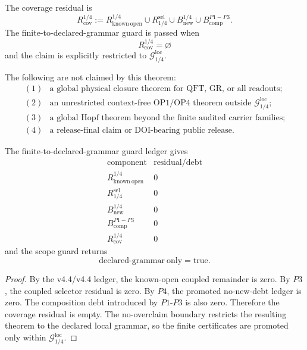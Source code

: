 \begin{definition}
The coverage residual is
\[
    R_{\mathrm{cov}}^{1/4}
    :=
    R_{\mathrm{known\ open}}^{1/4}
    \cup
    R_{1/4}^{\mathrm{sel}}
    \cup
    B_{\mathrm{new}}^{1/4}
    \cup
    B_{\mathrm{comp}}^{P1-P3}.
\]
The finite-to-declared-grammar guard is passed when
\[
    R_{\mathrm{cov}}^{1/4}=\varnothing
\]
and the claim is explicitly restricted to \(\mathcal G_{1/4}^{\mathrm{loc}}\).
\end{definition}

\begin{definition}
The following are not claimed by this theorem:
\[
\begin{array}{ll}
(1) & \text{a global physical closure theorem for QFT, GR, or all readouts;}\\
(2) & \text{an unrestricted context-free OP1/OP4 theorem outside }
      \mathcal G_{1/4}^{\mathrm{loc}};\\
(3) & \text{a global Hopf theorem beyond the finite audited carrier families;}\\
(4) & \text{a release-final claim or DOI-bearing public release.}
\end{array}
\]
\end{definition}

\begin{proposition}
The finite-to-declared-grammar guard ledger gives
\[
\begin{array}{c|r}
\text{component} & \text{residual/debt}\\
\hline
R_{\mathrm{known\ open}}^{1/4} & 0\\
R_{1/4}^{\mathrm{sel}} & 0\\
B_{\mathrm{new}}^{1/4} & 0\\
B_{\mathrm{comp}}^{P1-P3} & 0\\
R_{\mathrm{cov}}^{1/4} & 0
\end{array}
\]
and the scope guard returns
\[
    \mathrm{declared\text{-}grammar\ only}=\mathrm{true}.
\]
\end{proposition}

\begin{proof}
By the v4.4/v4.4 ledger, the known-open coupled remainder is zero.  By \(P3\),
the coupled selector residual is zero.  By \(P4\), the promoted no-new-debt
ledger is zero.  The composition debt introduced by \(P1\)-\(P3\) is also zero.
Therefore the coverage residual is empty.  The no-overclaim boundary restricts
the resulting theorem to the declared local grammar, so the finite
certificates are promoted only within \(\mathcal G_{1/4}^{\mathrm{loc}}\).
\end{proof}

